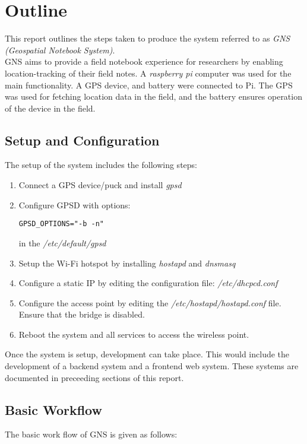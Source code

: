 
\section{Outline}
This report outlines the steps taken to produce the system referred to as \textit{GNS (Geospatial Notebook System)}.\\
GNS aims to provide a field notebook experience for researchers by enabling location-tracking of their field notes. A \textit{raspberry pi} computer was used for the main functionality. A GPS device, and battery were connected to Pi. The GPS was used for fetching location data in the field, and the battery ensures operation of the device in the field.

\subsection{Setup and Configuration}
The setup of the system includes the following steps:

\begin{enumerate}
	\item Connect a GPS device/puck and install \textit{gpsd}
\item Configure GPSD with options: \begin{verbatim}GPSD_OPTIONS="-b -n"\end{verbatim} in the \textit{/etc/default/gpsd}
\item Setup the Wi-Fi hotspot by installing \textit{hostapd} and \textit{dnsmasq}
\item Configure a static IP by editing the configuration file: \textit{/etc/dhcpcd.conf}
\item Configure the access point by editing the \textit{/etc/hostapd/hostapd.conf} file. Ensure that the bridge is disabled.
\item Reboot the system and all services to access the wireless point.
\end{enumerate}

\noindent
Once the system is setup, development can take place. This would include the development of a backend system and a frontend web system. These systems are documented in preceeding sections of this report.

\subsection{Basic Workflow}
The basic work flow of GNS is given as follows:

